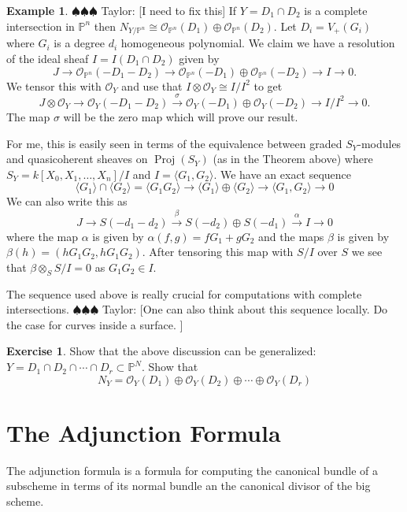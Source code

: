 \documentclass[12pt]{article}
\numberwithin{equation}{section}
\theoremstyle{definition}
\newtheorem{example}[theorem]{Example}
\newtheorem{exercise}[theorem]{Exercise}
\theoremstyle{remark}
\newcommand{\Ocal}{\mathcal{O}}
\newcommand{\PP}{\mathbb{P}}
\newcommand{\Proj}{\operatorname{Proj}}
\newcommand{\taylor}[1]{{\color{blue} \sf $\spadesuit\spadesuit\spadesuit$ Taylor: [#1]}}
\begin{document}
\begin{example}
	\taylor{I need to fix this}
	If $Y= D_1\cap D_2$ is a complete intersection in $\PP^n$ then $N_{Y/\PP^n} \cong \Ocal_{\PP^n}(D_1)\oplus \Ocal_{\PP^n}(D_2)$. 
	Let $D_i = V_+(G_i)$ where $G_i$ is a degree $d_i$ homogeneous polynomial.
	We claim we have a resolution of the ideal sheaf $I = I(D_1 \cap D_2)$ given by
	$$ J \to \Ocal_{\PP^n}(-D_1-D_2) \to \Ocal_{\PP^n}(-D_1) \oplus \Ocal_{\PP^n}(-D_2) \to I \to 0.$$
	We tensor this with $\Ocal_Y$ and use that $I\otimes \Ocal_Y \cong I/I^2$ to get
	$$ J \otimes \Ocal_Y \to \Ocal_Y(-D_1-D_2) \xrightarrow{\sigma} \Ocal_Y(-D_1)\oplus \Ocal_Y(-D_2) \to I/I^2 \to 0. $$
	The map $\sigma$ will be the zero map which will prove our result. 
	
	For me, this is easily seen in terms of the equivalence between graded $S_Y$-modules and quasicoherent sheaves on $\Proj(S_Y)$ (as in the Theorem above) where $S_Y = k[X_0,X_1,\ldots,X_n]/I$ and $I = \langle G_1,G_2 \rangle $.
	We have an exact sequence 
	$$ \langle G_1\rangle\cap \langle G_2 \rangle = \langle G_1G_2 \rangle \to \langle G_1 \rangle \oplus \langle G_2 \rangle  \to  \langle G_1,G_2 \rangle \to 0 $$
	We can also write this as 
	$$ J \to S(-d_1-d_2) \xrightarrow{\beta} S(-d_2)\oplus S(-d_1) \xrightarrow{\alpha} I \to 0 $$
	where the map $\alpha$ is given by $\alpha(f,g) = fG_1 + gG_2$ and the maps $\beta$ is given by $\beta(h) = (hG_1G_2,hG_1G_2)$. 
	After tensoring this map with $S/I$ over $S$ we see that $\beta\otimes_S S/I=0$ as $G_1G_2 \in I$.
\end{example}

The sequence used above is really crucial for computations with complete intersections. \taylor{One can also think about this sequence locally. 
Do the case for curves inside a surface. }

\begin{exercise}
Show that the above discussion can be generalized: $Y = D_1 \cap D_2 \cap \cdots \cap D_r \subset \PP^N$. 
Show that 
 $$ N_Y = \Ocal_Y(D_1) \oplus \Ocal_Y(D_2) \oplus \cdots \oplus \Ocal_Y(D_r) $$
\end{exercise}

\section{The Adjunction Formula}
The adjunction formula is a formula for computing the canonical bundle of a subscheme in terms of its normal bundle an the canonical divisor of the big scheme.
\end{document}
